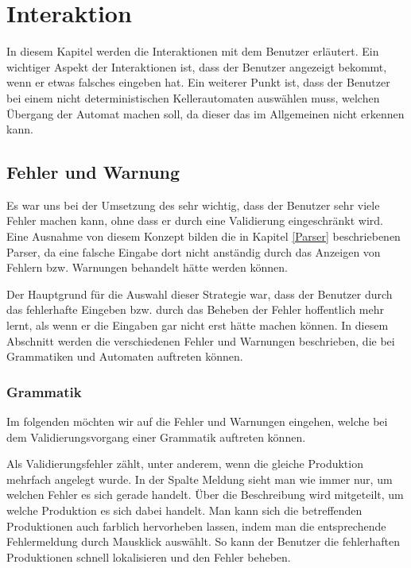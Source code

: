 

\chapter{Interaktion}\label{Interaction}

In diesem Kapitel werden die Interaktionen mit dem Benutzer erläutert. Ein
wichtiger Aspekt der Interaktionen ist, dass der Benutzer angezeigt bekommt,
wenn er etwas falsches eingeben hat. Ein weiterer Punkt ist, dass der Benutzer
bei einem nicht deterministischen Kellerautomaten auswählen muss, welchen
Übergang der Automat machen soll, da dieser das im Allgemeinen nicht erkennen
kann.


\section{Fehler und Warnung}\label{InteractionErrorWarning}

Es war uns bei der Umsetzung des \gtitools sehr wichtig, dass der Benutzer sehr
viele Fehler machen kann, ohne dass er durch eine Validierung eingeschränkt wird.
Eine Ausnahme von diesem Konzept bilden die in Kapitel \ref{Parser} beschriebenen
Parser, da eine falsche Eingabe dort nicht anständig durch das Anzeigen von
Fehlern bzw. Warnungen behandelt hätte werden können.\vspace{10pt}

Der Hauptgrund für die Auswahl dieser Strategie war, dass der Benutzer durch das
fehlerhafte Eingeben bzw. durch das Beheben der Fehler hoffentlich mehr lernt,
als wenn er die Eingaben gar nicht erst hätte machen können. In diesem Abschnitt
werden die verschiedenen Fehler und Warnungen beschrieben, die bei Grammatiken und
Automaten auftreten können.


\subsection{Grammatik}

Im folgenden möchten wir auf die Fehler und Warnungen eingehen, welche bei dem
Validierungsvorgang einer Grammatik auftreten können.\vspace{10pt}

Als Validierungsfehler zählt, unter anderem, wenn die gleiche Produktion mehrfach
angelegt wurde. In der Spalte Meldung sieht man wie immer nur, um welchen Fehler
es sich gerade handelt. Über die Beschreibung wird mitgeteilt, um welche
Produktion es sich dabei handelt. Man kann sich die betreffenden Produktionen
auch farblich hervorheben lassen, indem man die entsprechende Fehlermeldung durch
Mausklick auswählt. So kann der Benutzer die fehlerhaften Produktionen schnell
lokalisieren und den Fehler beheben.\vspace{10pt}


